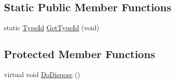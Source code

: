 \subsection*{Static Public Member Functions}
\begin{DoxyCompactItemize}
\item 
static \hyperlink{classns3_1_1TypeId}{Type\+Id} \hyperlink{classns3_1_1DataCollector_a2ad27595a6109b6f14a3309ccf84cc52}{Get\+Type\+Id} (void)
\end{DoxyCompactItemize}
\subsection*{Protected Member Functions}
\begin{DoxyCompactItemize}
\item 
virtual void \hyperlink{classns3_1_1DataCollector_abbcc4a28790950624f4dba47082d8af9}{Do\+Dispose} ()
\end{DoxyCompactItemize}
